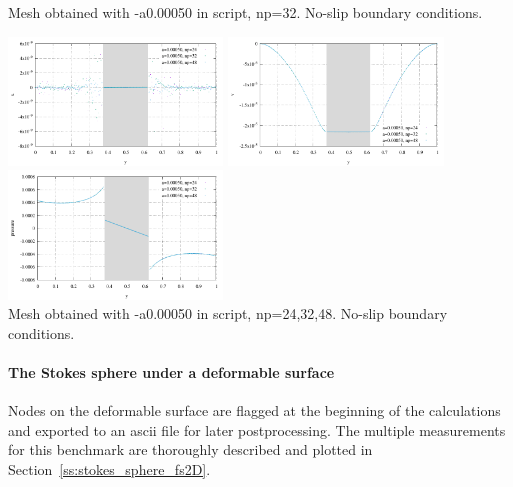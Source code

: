 \begin{center}
{\captionfont  Mesh obtained with -a0.00050 in script, np=32. No-slip boundary conditions.}
\end{center}

\begin{center}
\includegraphics[width=5.7cm]{python_codes/fieldstone_93/results_exp1/u}
\includegraphics[width=5.7cm]{python_codes/fieldstone_93/results_exp1/v}
\includegraphics[width=5.7cm]{python_codes/fieldstone_93/results_exp1/pressure}\\
{\captionfont  Mesh obtained with -a0.00050 in script, np=24,32,48. No-slip boundary conditions.}
\end{center}

\newpage
\paragraph{The Stokes sphere under a deformable surface}

Nodes on the deformable surface are flagged at the beginning of the calculations and 
exported to an ascii file for later postprocessing. The multiple measurements for this 
benchmark are thoroughly described and plotted in Section~\ref{ss:stokes_sphere_fs2D}.

